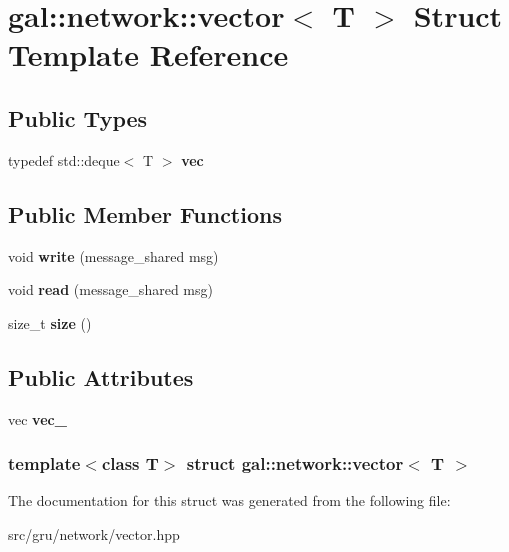 \hypertarget{structgal_1_1network_1_1vector}{\section{gal\-:\-:network\-:\-:vector$<$ \-T $>$ \-Struct \-Template \-Reference}
\label{structgal_1_1network_1_1vector}
}
\subsection*{\-Public \-Types}
\begin{DoxyCompactItemize}
\item 
\hypertarget{structgal_1_1network_1_1vector_af890cdbf59fd597b4034c4edf9a1826c}{typedef std\-::deque$<$ \-T $>$ {\bfseries vec}}\label{structgal_1_1network_1_1vector_af890cdbf59fd597b4034c4edf9a1826c}

\end{DoxyCompactItemize}
\subsection*{\-Public \-Member \-Functions}
\begin{DoxyCompactItemize}
\item 
\hypertarget{structgal_1_1network_1_1vector_aad0e2d9ae7b9eb9af0173690fca44db6}{void {\bfseries write} (message\-\_\-shared msg)}\label{structgal_1_1network_1_1vector_aad0e2d9ae7b9eb9af0173690fca44db6}

\item 
\hypertarget{structgal_1_1network_1_1vector_a9049ddcdf1c2f6e5722899f8363162fc}{void {\bfseries read} (message\-\_\-shared msg)}\label{structgal_1_1network_1_1vector_a9049ddcdf1c2f6e5722899f8363162fc}

\item 
\hypertarget{structgal_1_1network_1_1vector_adbffe90ff20f537ee98b611e0a5f474c}{size\-\_\-t {\bfseries size} ()}\label{structgal_1_1network_1_1vector_adbffe90ff20f537ee98b611e0a5f474c}

\end{DoxyCompactItemize}
\subsection*{\-Public \-Attributes}
\begin{DoxyCompactItemize}
\item 
\hypertarget{structgal_1_1network_1_1vector_a4efde91878f4a0e451955b18dcc6a7bd}{vec {\bfseries vec\-\_\-}}\label{structgal_1_1network_1_1vector_a4efde91878f4a0e451955b18dcc6a7bd}

\end{DoxyCompactItemize}
\subsubsection*{template$<$class T$>$ struct gal\-::network\-::vector$<$ T $>$}



\-The documentation for this struct was generated from the following file\-:\begin{DoxyCompactItemize}
\item 
src/gru/network/vector.\-hpp\end{DoxyCompactItemize}

